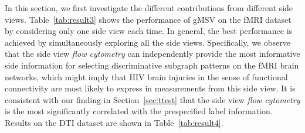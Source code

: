\documentclass[conference]{IEEEtran}
\newcommand{\galgo}[0]{gMSV}
\newcommand{\flo}[0]{\emph{flow cytometry}}
\begin{document}
In this section, we first investigate the different contributions from different side views. Table~\ref{tab:result3} shows the performance of {\galgo} on the fMRI dataset by considering only one side view each time. In general, the best performance is achieved by simultaneously exploring all the side views. Specifically, we observe that the side view {\flo} can independently provide the most informative side information for selecting discriminative subgraph patterns on the fMRI brain networks, which might imply that HIV brain injuries in the sense of functional connectivity are most likely to express in measurements from this side view. It is consistent with our finding in Section~\ref{sec:ttest} that the side view {\flo} is the most significantly correlated with the prespecified label information. Results on the DTI dataset are shown in Table~\ref{tab:result4}.
\end{document}
